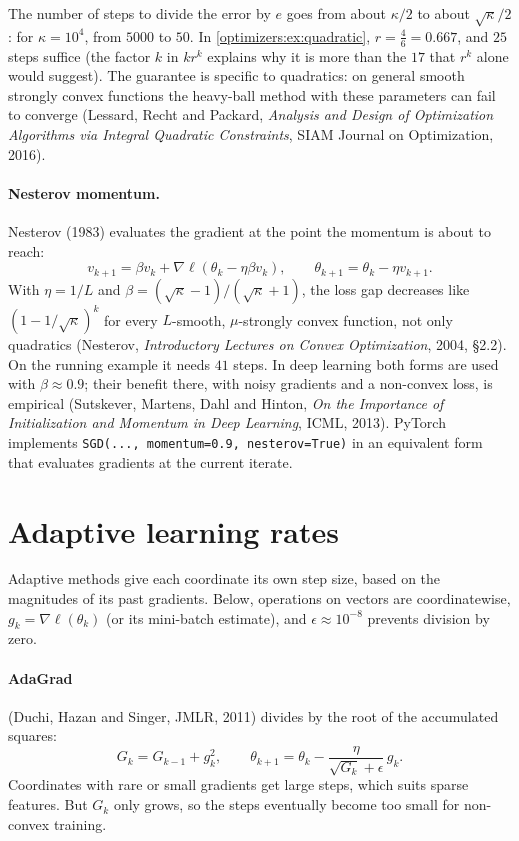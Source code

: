 \begin{notechapter}
The number of steps to divide the error by $e$ goes from about $\kappa/2$ to about $\sqrt\kappa/2$: for $\kappa = 10^4$,
from $5000$ to $50$. In \cref{optimizers:ex:quadratic}, $r = \frac46 = 0.667$, and $25$ steps suffice
(the factor $k$ in $kr^k$ explains why it is more than the $17$ that $r^k$ alone would suggest). The
guarantee is specific to quadratics: on general smooth strongly convex functions the
heavy-ball method with these parameters can fail to converge (Lessard, Recht and Packard,
\emph{Analysis and Design of Optimization Algorithms via Integral Quadratic Constraints},
SIAM Journal on Optimization, 2016).

\paragraph{Nesterov momentum.} Nesterov (1983) evaluates the gradient at the point the
momentum is about to reach:
\[
  v_{k+1} = \beta v_k + \nabla\ell(\theta_k - \eta\beta v_k),\qquad\theta_{k+1} = \theta_k - \eta v_{k+1} .
\]
With $\eta = 1/L$ and $\beta = (\sqrt\kappa - 1)/(\sqrt\kappa + 1)$, the loss gap decreases like $(1 - 1/\sqrt\kappa)^k$ for every $L$-smooth,
$\mu$-strongly convex function, not only quadratics (Nesterov, \emph{Introductory Lectures on
Convex Optimization}, 2004, §2.2). On the running example it needs $41$ steps. In deep
learning both forms are used with $\beta\approx0.9$; their benefit there, with noisy gradients and a
non-convex loss, is empirical (Sutskever, Martens, Dahl and Hinton, \emph{On the Importance of
Initialization and Momentum in Deep Learning}, ICML, 2013). PyTorch implements
\texttt{SGD(..., momentum=0.9, nesterov=True)} in an equivalent form that evaluates
gradients at the current iterate.

\section{Adaptive learning rates}\label{optimizers:sec:adaptive}

Adaptive methods give each coordinate its own step size, based on the magnitudes of its
past gradients. Below, operations on vectors are coordinatewise, $g_k = \nabla\ell(\theta_k)$ (or its
mini-batch estimate), and $\epsilon\approx10^{-8}$ prevents division by zero.

\paragraph{AdaGrad} (Duchi, Hazan and Singer, JMLR, 2011) divides by the root of the
accumulated squares:
\[
  G_k = G_{k-1} + g_k^2,\qquad\theta_{k+1} = \theta_k - \frac\eta{\sqrt{G_k} + \epsilon}\,g_k .
\]
Coordinates with rare or small gradients get large steps, which suits sparse features. But
$G_k$ only grows, so the steps eventually become too small for non-convex training.


\end{notechapter}
